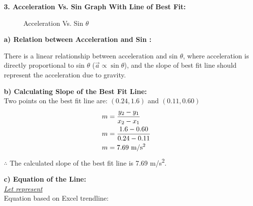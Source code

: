 \documentclass[12pt,letterpaper]{article}
\newcommand\tab[1][1cm]{\hspace*{#1}}
\begin{document}
\noindent
\textbf{3. Acceleration Vs. Sin \bm{$\theta$} Graph With Line of Best Fit:}
\begin{figure}[H]
	\caption{Acceleration Vs. Sin $\theta$\label{figure2}}
	\vspace{-4mm}
\end{figure}
\vspace{-4mm}

\noindent
\textbf{\tab a) Relation between Acceleration and Sin \bm{$\theta$}:}

\noindent
\tab There is a linear relationship between acceleration and sin $\theta$, where acceleration is \tab directly proportional to sin $\theta$ ($\vec{a}\propto \sin\theta$), and the slope of best fit line should \tab represent the acceleration due to gravity.

\newpage

\noindent
\textbf{\tab b) Calculating Slope of the Best Fit Line:}\\
\noindent
\tab Two points on the best fit line are: $(0.24,1.6)$ and $(0.11,0.60)$
\vspace{-4mm}
\[
	\begin{aligned}
		m & = \frac{y_{2}-y_{1}}{x_{2}-x_{1}}    \\
		m & =\frac{1.6-0.60}{0.24-0.11}          \\
		m & =7.69 \text{~m/s\textsuperscript{2}}
	\end{aligned}
	\vspace{-4mm}
\]
\noindent
\tab $\therefore$ The calculated slope of the best fit line is 7.69 m/s\textsuperscript{2}.

\vspace{4mm}
\noindent
\textbf{\tab c) Equation of the Line:}\\
\noindent
\tab \underline{\textit{Let  represent \boldmath{$\sin \theta$}}}\\
\tab Equation based on Excel trendline: 
\end{document}
